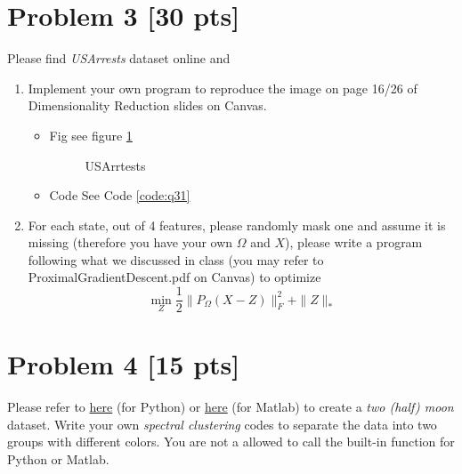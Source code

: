 \documentclass[11pt]{article}
\newcommand{\mfile}[1]  {{\small }} %
\begin{document}
\section*{Problem 3 [30 pts]}
Please find \textit{USArrests} dataset online and 
\begin{enumerate}
	\item Implement your own program to reproduce the image on page 16/26 of  Dimensionality Reduction slides on Canvas.
	\begin{itemize}
		\item Fig see figure \ref{fig:q31}
		\begin{figure}
			\centering
			\caption{USArrtests}
			\label{fig:q31}
		  \end{figure} 
		\item Code
		See Code \ref{code:q31}
		\mfile{Q3_1.py}\label{code:q31}
	\end{itemize}
	
	\item For each state, out of 4 features, please randomly mask one and assume it is missing (therefore you have your own $\Omega$ and $X$), please write a program following what we discussed in class (you may refer to ProximalGradientDescent.pdf on Canvas) to optimize  
		\begin{equation}
		\min_{Z} \frac{1}{2}\|P_\Omega(X-Z)\|_F^2+\|Z\|_*
	\end{equation}
\end{enumerate}


\newpage

\section*{Problem 4 [15 pts]}
Please refer to \href{https://shadow-ssml.readthedocs.io/en/latest/examples/halfmoons_example.html}{here} (for Python) or \href{https://github.com/jaejun-yoo/shallow-DANN-two-moon-dataset}{here} (for Matlab) to create a \textit{two (half) moon} dataset. Write your own \textit{spectral clustering} codes to separate the data into two groups with different colors.  You are not a allowed to call the built-in function for Python or Matlab.
\newpage
\end{document}
